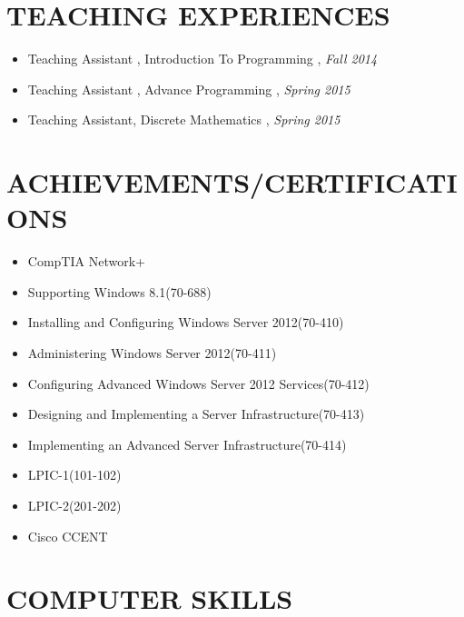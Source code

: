 \documentclass{res}
\begin{document}
\begin{resume}
	\section{TEACHING EXPERIENCES}
		\begin{itemize}
			\item Teaching Assistant , Introduction To Programming , \textit{Fall 2014}
			\item Teaching Assistant , Advance Programming , \textit{Spring 2015}
			\item Teaching Assistant, Discrete Mathematics , \textit{Spring 2015}
		\end{itemize}
	
	\section{ACHIEVEMENTS/CERTIFICATIONS}
	
	\begin{itemize}
		\item CompTIA Network+
		\item Supporting Windows 8.1(70-688)
		\item Installing and Configuring Windows Server 2012(70-410)
		\item Administering Windows Server 2012(70-411)
		\item Configuring Advanced Windows Server 2012 Services(70-412)
		\item Designing and Implementing a Server Infrastructure(70-413)
		\item Implementing an Advanced Server Infrastructure(70-414)
		\item LPIC-1(101-102)
		\item LPIC-2(201-202)
		\item Cisco CCENT
	\end{itemize}
	
	\section{COMPUTER SKILLS}
	

\end{resume}
\end{document}
